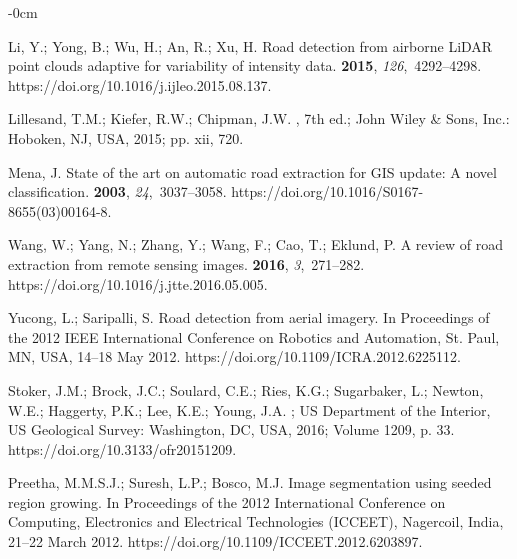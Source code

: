 \documentclass[remotesensing,article,accept,pdftex,moreauthors]{Definitions/mdpi}
\begin{document}
\begin{adjustwidth}{-\extralength}{0cm}
\begin{thebibliography}{999}
Li, Y.; Yong, B.; Wu, H.; An, R.; Xu, H.
\newblock Road detection from airborne LiDAR point clouds adaptive for
  variability of intensity data.
 {\bf 2015}, {\em 126},~4292--4298.
\newblock https://doi.org/10.1016/j.ijleo.2015.08.137.

Lillesand, T.M.; Kiefer, R.W.; Chipman, J.W.
, 7th ed.;
  John Wiley \& Sons, Inc.: Hoboken, NJ, USA, 2015; pp. xii, 720. %

Mena, J.
\newblock State of the art on automatic road extraction for GIS update: A novel
  classification.
 {\bf 2003}, {\em 24},~3037–3058.
\newblock https://doi.org/10.1016/S0167-8655(03)00164-8.

Wang, W.; Yang, N.; Zhang, Y.; Wang, F.; Cao, T.; Eklund, P.
\newblock A review of road extraction from remote sensing images.
 {\bf 2016}, {\em 3},~271--282.
\newblock https://doi.org/10.1016/j.jtte.2016.05.005.

Yucong, L.; Saripalli, S.
\newblock Road detection from aerial imagery. In Proceedings of the 2012 IEEE International Conference on Robotics and Automation, St. Paul, MN, USA, 14--18 May 2012. %
\newblock https://doi.org/10.1109/ICRA.2012.6225112.




Stoker, J.M.; Brock, J.C.; Soulard, C.E.; Ries, K.G.; Sugarbaker, L.; Newton, W.E.; Haggerty, P.K.; Lee, K.E.; Young, J.A.
; US Department of the Interior, US Geological Survey: Washington, DC, USA, 2016; Volume 1209, p. 33. https://doi.org/10.3133/ofr20151209. %

Preetha, M.M.S.J.; Suresh, L.P.; Bosco, M.J.
\newblock Image segmentation using seeded region growing. In Proceedings of the 2012 International Conference on Computing, Electronics and Electrical Technologies (ICCEET), Nagercoil, India, 21--22 March 2012.
\newblock https://doi.org/10.1109/ICCEET.2012.6203897. %


\end{thebibliography}
\end{adjustwidth}
\end{document}
